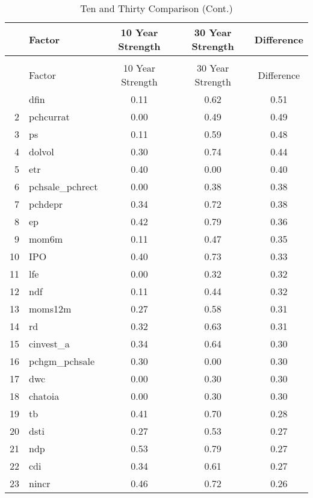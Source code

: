 \documentclass[12pt]{article}
\begin{document}
\begin{footnotesize}
	\setlength{\tabcolsep}{2pt}
	\singlespacing
	\centering					
	\begin{longtable}{rl|c|c|c}
		\caption{Ten and Thirty Comparison}\\
		
		\hline
		\hline
		& Factor & 10 Year Strength & 30 Year Strength & Difference \\ 
		\hline
		\endfirsthead
		
		\caption{Ten and Thirty Comparison (Cont.)}\\
		\hline
		\hline
		& Factor & 10 Year Strength & 30 Year Strength & Difference \\
		\hline
		\endhead
		
		\hline\hline
		\endfoot
		1 & dfin & 0.11 & 0.62 & 0.51 \\ 
  2 & pchcurrat & 0.00 & 0.49 & 0.49 \\ 
  3 & ps & 0.11 & 0.59 & 0.48 \\ 
  4 & dolvol & 0.30 & 0.74 & 0.44 \\ 
  5 & etr & 0.40 & 0.00 & 0.40 \\ 
  6 & pchsale\_pchrect & 0.00 & 0.38 & 0.38 \\ 
  7 & pchdepr & 0.34 & 0.72 & 0.38 \\ 
  8 & ep & 0.42 & 0.79 & 0.36 \\ 
  9 & mom6m & 0.11 & 0.47 & 0.35 \\ 
  10 & IPO & 0.40 & 0.73 & 0.33 \\ 
  11 & lfe & 0.00 & 0.32 & 0.32 \\ 
  12 & ndf & 0.11 & 0.44 & 0.32 \\ 
  13 & moms12m & 0.27 & 0.58 & 0.31 \\ 
  14 & rd & 0.32 & 0.63 & 0.31 \\ 
  15 & cinvest\_a & 0.34 & 0.64 & 0.30 \\ 
  16 & pchgm\_pchsale & 0.30 & 0.00 & 0.30 \\ 
  17 & dwc & 0.00 & 0.30 & 0.30 \\ 
  18 & chatoia & 0.00 & 0.30 & 0.30 \\ 
  19 & tb & 0.41 & 0.70 & 0.28 \\ 
  20 & dsti & 0.27 & 0.53 & 0.27 \\ 
  21 & ndp & 0.53 & 0.79 & 0.27 \\ 
  22 & cdi & 0.34 & 0.61 & 0.27 \\ 
  23 & nincr & 0.46 & 0.72 & 0.26 \\ 

\end{longtable}
\end{footnotesize}
\end{document}
